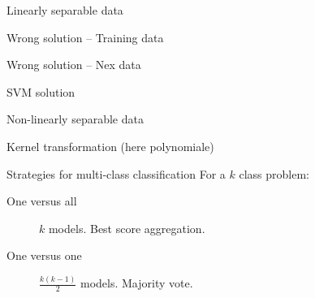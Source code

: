 \begin{frame}{Linearly separable data}
\end{frame}

\begin{frame}{Wrong solution -- Training data}
\end{frame}

\begin{frame}{Wrong solution -- Nex data}
\end{frame}

\begin{frame}{SVM solution}
\end{frame}

\begin{frame}{Non-linearly separable data}
\end{frame}

\begin{frame}{Kernel transformation (here polynomiale)}
\end{frame}

\begin{frame}{Strategies for multi-class classification}
  For a $k$ class problem:

  \begin{description}
    \item[One versus all] $k$ models. Best score aggregation.
    \item[One versus one] $\frac{k(k - 1)}{2}$ models. Majority vote.
  \end{description}
\end{frame}
